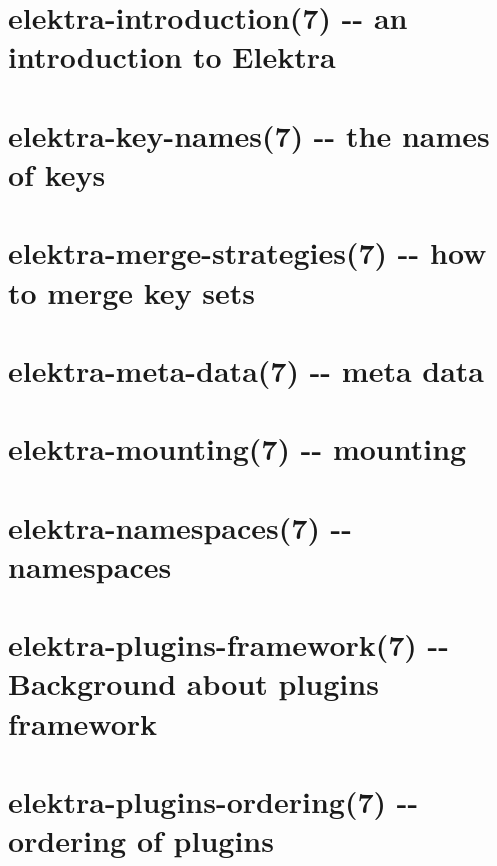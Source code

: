 \documentclass[twoside]{book}
\newcommand{\+}{\discretionary{\mbox{\scriptsize$\hookleftarrow$}}{}{}}
\begin{document}
\chapter{elektra-\/introduction(7) -\/-\/ an introduction to Elektra}
\label{md_doc_help_elektra-introduction}
\hypertarget{md_doc_help_elektra-introduction}{}

\chapter{elektra-\/key-\/names(7) -\/-\/ the names of keys}
\label{md_doc_help_elektra-key-names}
\hypertarget{md_doc_help_elektra-key-names}{}

\chapter{elektra-\/merge-\/strategies(7) -\/-\/ how to merge key sets}
\label{md_doc_help_elektra-merge-strategy}
\hypertarget{md_doc_help_elektra-merge-strategy}{}

\chapter{elektra-\/meta-\/data(7) -\/-\/ meta data}
\label{md_doc_help_elektra-meta-data}
\hypertarget{md_doc_help_elektra-meta-data}{}

\chapter{elektra-\/mounting(7) -\/-\/ mounting}
\label{md_doc_help_elektra-mounting}
\hypertarget{md_doc_help_elektra-mounting}{}

\chapter{elektra-\/namespaces(7) -\/-\/ namespaces}
\label{md_doc_help_elektra-namespaces}
\hypertarget{md_doc_help_elektra-namespaces}{}

\chapter{elektra-\/plugins-\/framework(7) -\/-\/ Background about plugins framework}
\label{md_doc_help_elektra-plugins-framework}
\hypertarget{md_doc_help_elektra-plugins-framework}{}

\chapter{elektra-\/plugins-\/ordering(7) -\/-\/ ordering of plugins}
\label{md_doc_help_elektra-plugins-ordering}
\hypertarget{md_doc_help_elektra-plugins-ordering}{}

\end{document}
